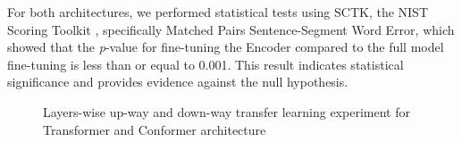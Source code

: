 For both architectures, we performed statistical tests using SCTK, the NIST Scoring Toolkit \cite{SCTK_nist}, specifically Matched Pairs Sentence-Segment Word Error, which showed that the \textit{p}-value for fine-tuning the Encoder compared to the full model fine-tuning is less than or equal to 0.001. This result indicates statistical significance and provides evidence against the null hypothesis.

\begin{figure}[h]
    \centering
    \caption{Layers-wise up-way and down-way transfer learning experiment for Transformer and Conformer architecture}
    \label{fig:layerWISE}
\end{figure}

